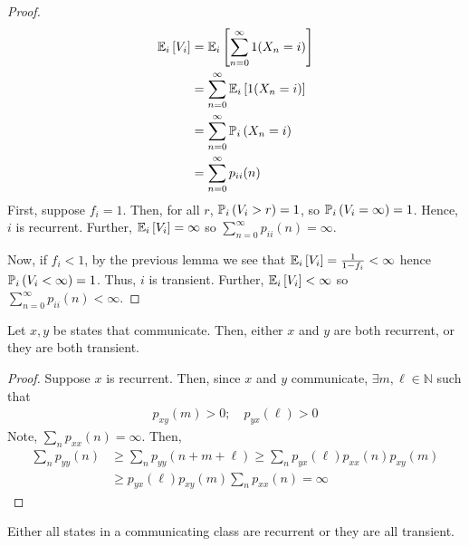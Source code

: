 \begin{proof}
	\begin{align*}
		\mathbb{E}_{i}\left[{V_i}\right] & = \mathbb{E}_{i}\left[{\sum_{n=0}^\infty 1(X_n = i)}\right] \\
		& = \sum_{n=0}^\infty \mathbb{E}_{i}\left[{1(X_n = i)}\right] \\
		& = \sum_{n=0}^\infty \mathbb{P}_{i}\left({X_n = i}\right)    \\
		& = \sum_{n=0}^\infty p_{ii}(n)
	\end{align*}
	First, suppose $f_i = 1$.
	Then, for all $r$, $\mathbb{P}_{i}\left({V_i > r}\right) = 1$, so $\mathbb{P}_{i}\left({V_i = \infty}\right) = 1$.
	Hence, $i$ is recurrent.
	Further, $\mathbb{E}_{i}\left[{V_i}\right] = \infty$ so $\sum_{n=0}^\infty p_{ii}(n) = \infty$.

	Now, if $f_i < 1$, by the previous lemma we see that $\mathbb{E}_{i}\left[{V_i}\right] = \frac{1}{1-f_i} < \infty$ hence $\mathbb{P}_{i}\left({V_i < \infty}\right) = 1$.
	Thus, $i$ is transient.
	Further, $\mathbb{E}_{i}\left[{V_i}\right] < \infty$ so $\sum_{n=0}^\infty p_{ii}(n) < \infty$.
\end{proof}
\begin{theorem}
	Let $x, y$ be states that communicate.
	Then, either $x$ and $y$ are both recurrent, or they are both transient.
\end{theorem}
\begin{proof}
	Suppose $x$ is recurrent.
	Then, since $x$ and $y$ communicate, $\exists m, \ell \in \mathbb N$ such that
	\begin{align*}
		p_{xy}(m) > 0;\quad p_{yx}(\ell) > 0
	\end{align*}
	Note, $\sum_n p_{xx}(n) = \infty$.
	Then,
	\begin{align*}
		\sum_n p_{yy}(n) &\geq \sum_n p_{yy}(n+m+\ell) \geq \sum_n p_{yx}(\ell) p_{xx}(n) p_{xy}(m) \\
		&\geq p_{yx}(\ell) p_{xy}(m) \sum_n p_{xx}(n) = \infty
	\end{align*}
\end{proof}
\begin{corollary}
	Either all states in a communicating class are recurrent or they are all transient.
\end{corollary}

